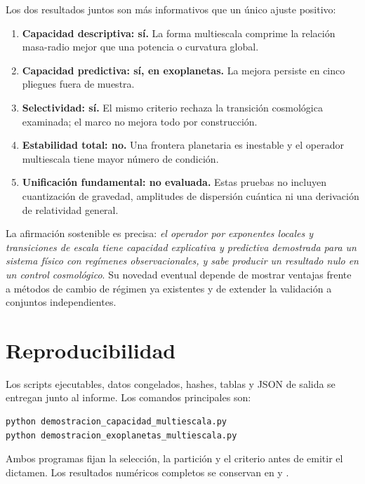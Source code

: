 \documentclass[10pt,twocolumn]{article}
\begin{document}
Los dos resultados juntos son más informativos que un único ajuste positivo:
\begin{enumerate}
\item \textbf{Capacidad descriptiva: sí.} La forma multiescala comprime la
relación masa-radio mejor que una potencia o curvatura global.
\item \textbf{Capacidad predictiva: sí, en exoplanetas.} La mejora persiste en
cinco pliegues fuera de muestra.
\item \textbf{Selectividad: sí.} El mismo criterio rechaza la transición
cosmológica examinada; el marco no mejora todo por construcción.
\item \textbf{Estabilidad total: no.} Una frontera planetaria es inestable y el
operador multiescala tiene mayor número de condición.
\item \textbf{Unificación fundamental: no evaluada.} Estas pruebas no incluyen
cuantización de gravedad, amplitudes de dispersión cuántica ni una derivación
de relatividad general.
\end{enumerate}

La afirmación sostenible es precisa: \emph{el operador por exponentes locales
y transiciones de escala tiene capacidad explicativa y predictiva demostrada
para un sistema físico con regímenes observacionales, y sabe producir un
resultado nulo en un control cosmológico}. Su novedad eventual depende de
mostrar ventajas frente a métodos de cambio de régimen ya existentes y de
extender la validación a conjuntos independientes.

\section{Reproducibilidad}

Los scripts ejecutables, datos congelados, hashes, tablas y JSON de salida se
entregan junto al informe. Los comandos principales son:
\begin{verbatim}
python demostracion_capacidad_multiescala.py
python demostracion_exoplanetas_multiescala.py
\end{verbatim}
Ambos programas fijan la selección, la partición y el criterio antes de emitir
el dictamen. Los resultados numéricos completos se conservan en
 y
.
\end{document}

